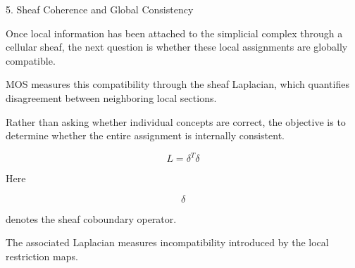 %
%

\begin{mosbox}{5. Sheaf Coherence and Global Consistency}

\BodyFont

Once local information has been attached to the simplicial complex through
a cellular sheaf, the next question is whether these local assignments are
globally compatible.

MOS measures this compatibility through the sheaf Laplacian, which
quantifies disagreement between neighboring local sections.

Rather than asking whether individual concepts are correct, the objective
is to determine whether the entire assignment is internally consistent.

\end{mosbox}


\begin{eqbox}

\[
\boxed{
L=\delta^{T}\delta
}
\]

\vspace{3mm}

\BodyFont

Here

\[
\delta
\]

denotes the sheaf coboundary operator.

The associated Laplacian measures incompatibility introduced by the local
restriction maps.

\end{eqbox}


\vspace{5mm}

